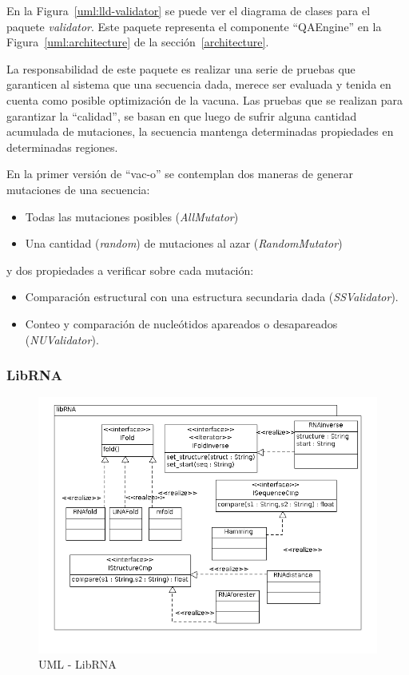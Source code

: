   En la Figura~\ref{uml:lld-validator} se puede ver el diagrama de clases
para el paquete \textit{validator}. Este paquete representa el componente
``QAEngine'' en la Figura~\ref{uml:architecture} de la
secci\'on~\ref{architecture}.

  La responsabilidad de este paquete es realizar una serie de pruebas que
garanticen al sistema que una secuencia dada, merece ser evaluada y tenida en
cuenta como posible optimizaci\'on de la vacuna. Las pruebas que se realizan
para garantizar la ``calidad'', se basan en que luego de sufrir alguna cantidad
acumulada de mutaciones, la secuencia mantenga determinadas propiedades en
determinadas regiones.

  En la primer versi\'on de ``vac-o'' se contemplan dos maneras de generar
mutaciones de una secuencia:
    \begin{itemize}
     \item Todas las mutaciones posibles (\textit{AllMutator})
     \item Una cantidad (\textit{random}) de mutaciones al azar
(\textit{RandomMutator})
    \end{itemize}
y dos propiedades a verificar sobre cada mutaci\'on:
    \begin{itemize}
     \item Comparaci\'on estructural con una estructura secundaria dada
(\textit{SSValidator}).
     \item Conteo y comparaci\'on de nucle\'otidos apareados o desapareados
(\textit{NUValidator}).
    \end{itemize}

  \subsubsection{LibRNA}
   \begin{figure}
      \centering
      \includegraphics[scale=0.5]{lld-librna.png}  
      \caption{UML - LibRNA}
      \label{uml:lld-librna}
    \end{figure}

